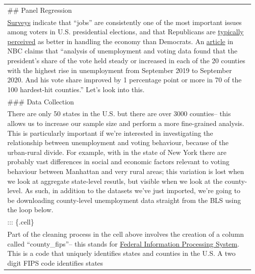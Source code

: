 \documentclass[
  letterpaper,
  DIV=11,
  numbers=noendperiod]{scrreprt}
\begin{document}
\begin{longtable}[]{@{}
  >{\raggedright\arraybackslash}p{}@{}}
\toprule\noalign{}
\endhead
\bottomrule\noalign{}
\endlastfoot
\#\# Panel Regression \\
\href{https://www.pewresearch.org/politics/2012/04/17/with-voters-focused-on-economy-obama-lead-narrows/}{Surveys}
indicate that ``jobs'' are consistently one of the most important issues
among voters in U.S. presidential elections, and that Republicans are
\href{https://thehill.com/homenews/campaign/3700047-republicans-hold-14-point-advantage-on-which-party-would-do-better-job-on-economy-poll/}{typically
perceived} as better in handling the economy than Democrats. An
\href{https://www.nbcnews.com/news/us-news/where-did-trump-make-election-gains-unemployment-data-tells-surprising-n1247935}{article}
in NBC claims that ``analysis of unemployment and voting data found that
the president's share of the vote held steady or increased in each of
the 20 counties with the highest rise in unemployment from September
2019 to September 2020. And his vote share improved by 1 percentage
point or more in 70 of the 100 hardest-hit counties.'' Let's look into
this. \\
\#\#\# Data Collection \\
There are only 50 states in the U.S. but there are over 3000 counties--
this allows us to increase our sample size and perform a more
fine-grained analysis. This is particularly important if we're
interested in investigating the relationship between unemployment and
voting behaviour, because of the urban-rural divide. For example, with
in the state of New York there are probably vast differences in social
and economic factors relevant to voting behaviour between Manhattan and
very rural areas; this variation is lost when we look at aggregate
state-level resutls, but visible when we look at the county-level. As
such, in addition to the datasets we've just imported, we're going to be
downloading county-level unemployment data straight from the BLS using
the loop below. \\
::: \{.cell\} \\
Part of the cleaning process in the cell above involves the creation of
a column called ``county\_fips''-- this stands for
\href{https://transition.fcc.gov/oet/info/maps/census/fips/fips.txt\#:~:text=FIPS\%20codes\%20are\%20numbers\%20which,to\%20which\%20the\%20county\%20belongs.}{Federal
Information Processing System}. This is a code that uniquely identifies
states and counties in the U.S. A two digit FIPS code identifies states

\end{longtable}
\end{document}
